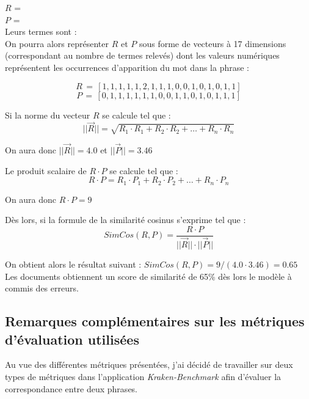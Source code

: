 $R$ = \\

$P$ = \\

Leurs termes sont : \\

On pourra alors représenter $R$ et $P$ sous forme de vecteurs à 17 dimensions (correspondant au nombre de termes relevés) dont les valeurs numériques représentent les occurrences d'apparition du mot dans la phrase :

$$R\,=\,[1,1,1,1,1,2,1,1,1,0,0,1,0,1,0,1,1]$$
$$P\,=\,[0,1,1,1,1,1,1,0,0,1,1,0,1,0,1,1,1]$$

Si la norme du vecteur $R$ se calcule tel que : $$||\overrightarrow{R}|| = \sqrt{R_1 \cdot R_1 + R_2 \cdot R_2 + \ldots + R_n \cdot R_n}$$

On aura donc $||\overrightarrow{R}|| = 4.0 $ et $||\overrightarrow{P}|| = 3.46 $

Le produit scalaire de $R \cdot P$ se calcule tel que : $$R \cdot P = R_1 \cdot P_1 + R_2 \cdot P_2 + \ldots + R_n \cdot P_n$$

On aura donc $R \cdot P = 9$

Dès lors, si la formule de la similarité cosinus s'exprime tel que : $$SimCos(R,P) = \frac{R \cdot P}{||\overrightarrow{R}|| \cdot ||\overrightarrow{P}||}$$

On obtient alors le résultat suivant : $SimCos(R,P) = 9 / (4.0 \cdot 3.46) = 0.65$ \\ Les documents obtiennent un score de similarité de 65\% dès lors le modèle à commis des erreurs.

\subsection{Remarques complémentaires sur les métriques d'évaluation utilisées}

Au vue des différentes métriques présentées, j'ai décidé de travailler sur deux types de métriques dans l'application \textit{Kraken-Benchmark} afin d'évaluer la correspondance entre deux phrases.


